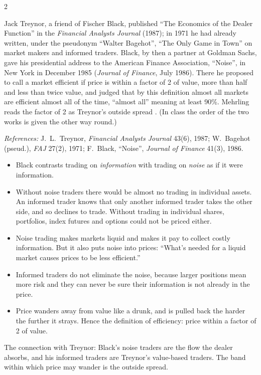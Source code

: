 \begin{paracol}{2}
\begin{history}
Jack Treynor, a friend of Fischer Black, published ``The Economics of the Dealer Function'' in the \emph{Financial Analysts Journal} (1987); in 1971 he had already written, under the pseudonym
``Walter Bagehot'', ``The Only Game in Town'' on market makers and informed traders. Black, by then a partner at Goldman Sachs, gave his presidential address to the American Finance Association,
``Noise'', in New York in December 1985 (\emph{Journal of Finance}, July 1986). There he proposed to call a market efficient if price is within a factor of 2 of value, more than half and less than
twice value, and judged that by this definition almost all markets are efficient almost all of the time, ``almost all'' meaning at least 90\%. Mehrling reads the factor of 2 as Treynor's outside
spread . (In class the order of the two works is given the other way round.)\par
\emph{References:} J.~L.~Treynor, \emph{Financial Analysts Journal} 43(6), 1987; W.~Bagehot (pseud.), \emph{FAJ} 27(2), 1971; F.~Black, ``Noise'', \emph{Journal of Finance} 41(3), 1986.
\end{history}

\begin{reading}
\begin{itemize}
  \item Black contrasts trading on \emph{information} with trading on \emph{noise} as if it were information.
  \item Without noise traders there would be almost no trading in individual assets. An informed trader knows that only another informed trader takes the other side, and so declines to trade. Without trading in individual shares, portfolios, index futures and options could not be priced either.
  \item Noise trading makes markets liquid and makes it pay to collect costly information. But it also puts noise into prices: ``What's needed for a liquid market causes prices to be less efficient.''
  \item Informed traders do not eliminate the noise, because larger positions mean more risk and they can never be sure their information is not already in the price.
  \item Price wanders away from value like a drunk, and is pulled back the harder the further it strays. Hence the definition of efficiency: price within a factor of 2 of value.
\end{itemize}
The connection with Treynor: Black's noise traders are the flow the dealer absorbs, and his informed traders are Treynor's value-based traders. The band within which price may wander is the outside spread.
\end{reading}


\end{paracol}
